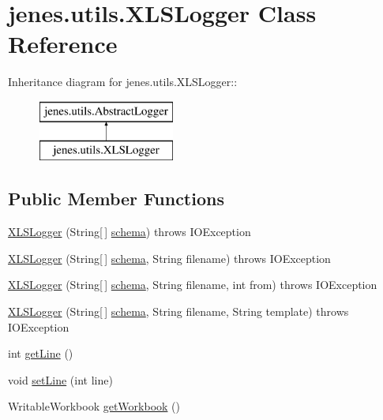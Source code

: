 \hypertarget{classjenes_1_1utils_1_1_x_l_s_logger}{
\section{jenes.utils.XLSLogger Class Reference}
\label{classjenes_1_1utils_1_1_x_l_s_logger}
}
Inheritance diagram for jenes.utils.XLSLogger::\begin{figure}[H]
\begin{center}
\leavevmode
\includegraphics[height=2cm]{classjenes_1_1utils_1_1_x_l_s_logger}
\end{center}
\end{figure}
\subsection*{Public Member Functions}
\begin{CompactItemize}
\item 
\hyperlink{classjenes_1_1utils_1_1_x_l_s_logger_1fa625f6c332aca9178b1c7a4eb963d8}{XLSLogger} (String\mbox{[}$\,$\mbox{]} \hyperlink{classjenes_1_1utils_1_1_abstract_logger_3a2030876857a0512fae7e0ad400c570}{schema})  throws IOException 
\item 
\hyperlink{classjenes_1_1utils_1_1_x_l_s_logger_256b5ddf3beaa1eedb2290b52bb1a845}{XLSLogger} (String\mbox{[}$\,$\mbox{]} \hyperlink{classjenes_1_1utils_1_1_abstract_logger_3a2030876857a0512fae7e0ad400c570}{schema}, String filename)  throws IOException 
\item 
\hyperlink{classjenes_1_1utils_1_1_x_l_s_logger_c43b3385840e86a2ad4acd5040e8326b}{XLSLogger} (String\mbox{[}$\,$\mbox{]} \hyperlink{classjenes_1_1utils_1_1_abstract_logger_3a2030876857a0512fae7e0ad400c570}{schema}, String filename, int from)  throws IOException 
\item 
\hyperlink{classjenes_1_1utils_1_1_x_l_s_logger_2e438a48213dd4e1773c380d7f9d7e4b}{XLSLogger} (String\mbox{[}$\,$\mbox{]} \hyperlink{classjenes_1_1utils_1_1_abstract_logger_3a2030876857a0512fae7e0ad400c570}{schema}, String filename, String template)  throws IOException 
\item 
int \hyperlink{classjenes_1_1utils_1_1_x_l_s_logger_60e8ee28d3d3305e085726026e09cfdc}{getLine} ()
\item 
void \hyperlink{classjenes_1_1utils_1_1_x_l_s_logger_2f9ce5372263fadce99a863149f3cb55}{setLine} (int line)
\item 
WritableWorkbook \hyperlink{classjenes_1_1utils_1_1_x_l_s_logger_b84e4c5e6518902f710cd3c3cc337f3d}{getWorkbook} ()
\end{CompactItemize}
